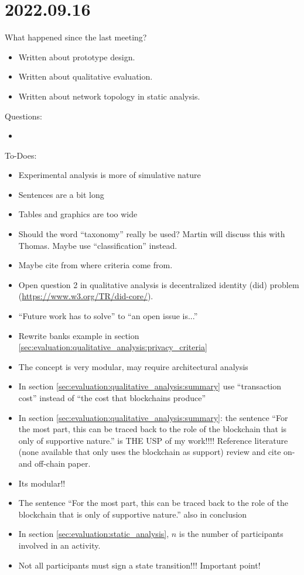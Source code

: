 \section{2022.09.16}
What happened since the last meeting?
\begin{itemize}
    \item Written about prototype design.
    \item Written about qualitative evaluation.
    \item Written about network topology in static analysis.
\end{itemize}

Questions:
\begin{itemize}
    \item 
\end{itemize}

To-Does:
\begin{itemize}
    \item Experimental analysis is more of simulative nature
    \item Sentences are a bit long
    \item Tables and graphics are too wide
    \item Should the word ``taxonomy'' really be used? Martin will discuss this with Thomas. Maybe use ``classification'' instead.
    \item Maybe cite from where criteria come from.
    \item[\checkmark] Open question 2 in qualitative analysis is decentralized identity (did) problem (\url{https://www.w3.org/TR/did-core/}).
    \item[\checkmark] ``Future work has to solve'' to ``an open issue is...''
    \item[\checkmark] Rewrite banks example in section \ref{sec:evaluation:qualitative_analysis:privacy_criteria}
    \item The concept is very modular, may require architectural analysis
    \item[\checkmark] In section \ref{sec:evaluation:qualitative_analysis:summary} use ``transaction cost'' instead of ``the cost that blockchains produce''
    \item In section \ref{sec:evaluation:qualitative_analysis:summary}: the sentence ``For the most part, this can be traced back to the role of the blockchain that is only of supportive nature.'' is THE USP of my work!!!! Reference literature (none available that only uses the blockchain as support) review and cite on- and off-chain paper.
    \item Its modular!!
    \item The sentence ``For the most part, this can be traced back to the role of the blockchain that is only of supportive nature.'' also in conclusion
    \item[\checkmark] In section \ref{sec:evaluation:static_analysis}, $n$ is the number of participants involved in an activity.
    \item[\checkmark] Not all participants must sign a state transition!!! Important point!
\end{itemize}


